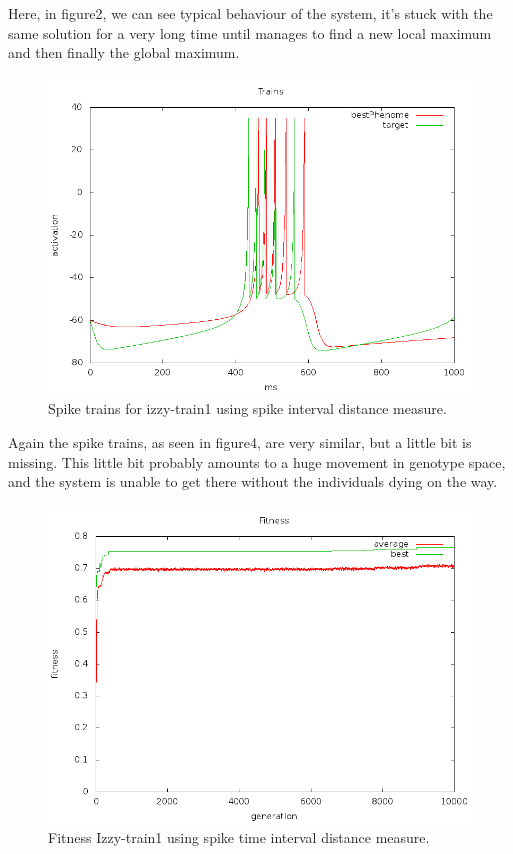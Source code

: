 \documentclass[a4paper]{article}
\begin{document}
Here, in figure2, we can see typical behaviour of the system, it's stuck with the same solution for a very long
time until manages to find a new local maximum and then finally the global maximum.

\begin{figure}[htb!]
  \centering
  \includegraphics[width=\textwidth]{SpikeInterval-izzy1-trains-plot.png}
  \caption{Spike trains for izzy-train1 using spike interval distance measure.}
\end{figure}

Again the spike trains, as seen in figure4, are very similar, but a little bit is missing. This little bit probably amounts to a huge movement in genotype space, and the system is unable to get there without the individuals dying on the way.

\newpage

\begin{figure}[htb!]
  \centering
  \includegraphics[width=\textwidth]{Waveform-izzy1-fitness-plot.png}
  \caption{Fitness Izzy-train1 using spike time interval distance measure.}
\end{figure}
\end{document}
